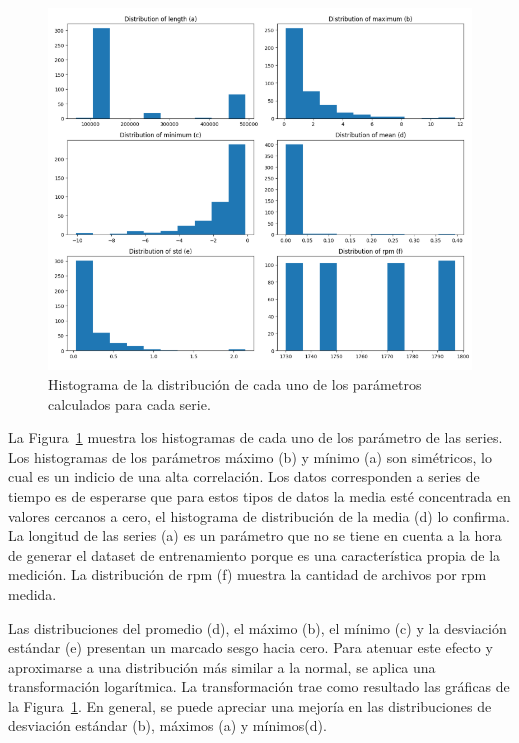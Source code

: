 \documentclass[11pt,a4paper,spanish]{book}
\numberwithin{equation}{chapter}
\numberwithin{figure}{chapter}
\begin{document}
\begin{figure}[h]
    \centering
    \includegraphics[width=1\textwidth]{media/dataset/histogram-01.png}
    \caption{Histograma de la distribución de cada uno de los parámetros calculados para cada serie. }
    \label{fig:figHistogram01}
\end{figure}


La Figura~\ref{fig:figHistogram01} muestra los histogramas de cada uno de los parámetro 
de las series. Los histogramas de los parámetros máximo (b) y mínimo (a) son simétricos, 
lo cual es un indicio de una alta correlación. Los datos corresponden a series de 
tiempo es de esperarse que para estos tipos de datos la media esté concentrada en 
valores cercanos a cero, el histograma de distribución de la media (d) lo confirma. 
La longitud de las series (a) es un parámetro que no se tiene en cuenta a la hora de 
generar el dataset de entrenamiento porque es una característica propia de la medición. 
La distribución de rpm (f) muestra la cantidad de archivos por rpm medida.    


Las distribuciones del promedio (d), el máximo (b), el mínimo (c) y la desviación 
estándar (e) presentan un marcado sesgo hacia cero. Para atenuar este efecto y 
aproximarse a una distribución más similar a la normal, se aplica una transformación 
logarítmica. La transformación trae como resultado las gráficas de la 
Figura~\ref{fig:figHistogram01}. En general, se puede apreciar una mejoría en las 
distribuciones de desviación estándar (b), máximos (a) y mínimos(d). 
\end{document}
